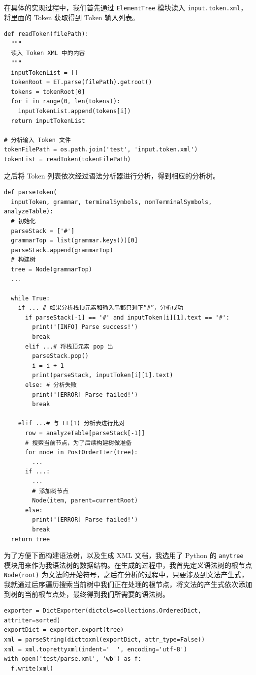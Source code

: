 \documentclass[UTF8]{ctexart}
\begin{document}
在具体的实现过程中，我们首先通过 \texttt{ElementTree} 模块读入 \texttt{input.token.xml}，将里面的 Token 获取得到 Token 输入列表。

\begin{verbatim}
def readToken(filePath):
  """
  读入 Token XML 中的内容
  """
  inputTokenList = []
  tokenRoot = ET.parse(filePath).getroot()
  tokens = tokenRoot[0]
  for i in range(0, len(tokens)):
    inputTokenList.append(tokens[i])
  return inputTokenList

# 分析输入 Token 文件
tokenFilePath = os.path.join('test', 'input.token.xml')
tokenList = readToken(tokenFilePath)
\end{verbatim}

之后将 Token 列表依次经过语法分析器进行分析，得到相应的分析树。

\begin{verbatim}
def parseToken(
  inputToken, grammar, terminalSymbols, nonTerminalSymbols, analyzeTable):
  # 初始化
  parseStack = ['#']
  grammarTop = list(grammar.keys())[0]
  parseStack.append(grammarTop)
  # 构建树
  tree = Node(grammarTop)
  ...

  while True:
    if ... # 如果分析栈顶元素和输入串都只剩下“#”，分析成功
      if parseStack[-1] == '#' and inputToken[i][1].text == '#':
        print('[INFO] Parse success!')
        break
      elif ...# 将栈顶元素 pop 出
        parseStack.pop()
        i = i + 1
        print(parseStack, inputToken[i][1].text)
      else: # 分析失败
        print('[ERROR] Parse failed!')
        break

    elif ...# 与 LL(1) 分析表进行比对
      row = analyzeTable[parseStack[-1]]
      # 搜索当前节点，为了后续构建树做准备
      for node in PostOrderIter(tree):
        ...
      if ...:
        ...
        # 添加树节点
        Node(item, parent=currentRoot)
      else:
        print('[ERROR] Parse failed!')
        break
  return tree
\end{verbatim}

为了方便下面构建语法树，以及生成 XML 文档，我选用了 Python 的 \texttt{anytree} 模块用来作为我语法树的数据结构。在生成的过程中，我首先定义语法树的根节点 \texttt{Node(root)} 为文法的开始符号，之后在分析的过程中，只要涉及到文法产生式，我就通过后序遍历搜索当前树中我们正在处理的根节点，将文法的产生式依次添加到树的当前根节点处，最终得到我们所需要的语法树。

\begin{verbatim}
exporter = DictExporter(dictcls=collections.OrderedDict, attriter=sorted)
exportDict = exporter.export(tree)
xml = parseString(dicttoxml(exportDict, attr_type=False))
xml = xml.toprettyxml(indent='  ', encoding='utf-8')
with open('test/parse.xml', 'wb') as f:
  f.write(xml)
\end{verbatim}
\end{document}
